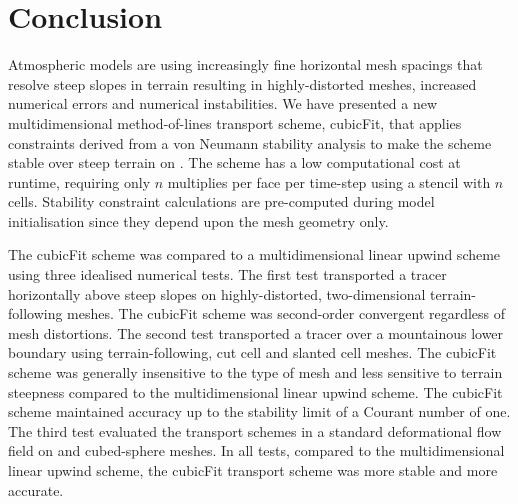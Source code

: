 \section{Conclusion}
\label{sec:conclusion}

Atmospheric models are using increasingly fine horizontal mesh spacings that resolve steep slopes in terrain resulting in highly-distorted meshes, increased numerical errors and numerical instabilities.
We have presented a new multidimensional method-of-lines transport scheme, cubicFit, that applies constraints derived from a von Neumann stability analysis to make the scheme stable over steep terrain on .
The scheme has a low computational cost at runtime, requiring only $n$ multiplies per face per time-step using a stencil with $n$ cells.  Stability constraint calculations are pre-computed during model initialisation since they depend upon the mesh geometry only.

The cubicFit scheme was compared to a multidimensional linear upwind scheme using three idealised numerical tests.
The first test transported a tracer horizontally above steep slopes on highly-distorted, two-dimensional terrain-following meshes.  The cubicFit scheme was second-order convergent regardless of mesh distortions.
The second test transported a tracer over a mountainous lower boundary using terrain-following, cut cell and slanted cell meshes.
The cubicFit scheme was generally insensitive to the type of mesh and less sensitive to terrain steepness compared to the multidimensional linear upwind scheme.
The cubicFit scheme maintained accuracy up to the stability limit of a Courant number of one.
The third test evaluated the transport schemes in a standard deformational flow field on  and cubed-sphere meshes.
In all tests, compared to the multidimensional linear upwind scheme, the cubicFit transport scheme was more stable and more accurate.

